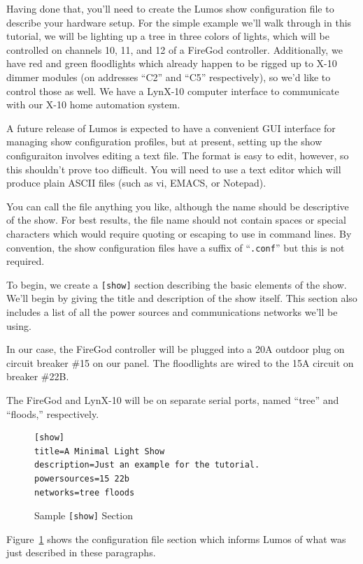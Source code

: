 \documentclass{article}
\begin{document}
Having done that, you'll need to create the Lumos show configuration file to
describe your hardware setup.  For the simple example we'll walk through in
this tutorial, we will be lighting up a tree in three colors of lights, which
will be controlled on channels 10, 11, and 12 of a FireGod controller.
Additionally, we have red and green floodlights which already happen to be
rigged up to X-10 dimmer modules (on addresses ``C2'' and ``C5'' respectively),
so we'd like to control those as well.
We have a LynX-10 computer interface to communicate with our X-10 home
automation system.

A future release of Lumos is expected to have a convenient GUI interface for
managing show configuration profiles, but at present, setting up the show
configuraiton involves editing a text file.  The format is easy to edit,
however, so this shouldn't prove too difficult.  You will need to use a text
editor which will produce plain ASCII files (such as vi, EMACS, or Notepad).

You can call the file anything you like, although the name should be
descriptive of the show.  For best results, the file name should not contain
spaces or special characters which would require quoting or escaping to use in
command lines.  By convention, the show configuration files have a suffix of
``{\tt.conf}'' but this is not required.

To begin, we create a {\tt[show]} section describing the basic elements of the
show.  We'll begin by giving the title and description of the show itself.
This section also includes a list of all the power sources and communications
networks we'll be using.

In our case, the FireGod controller will be plugged into a 20A outdoor plug on
circuit breaker \#15 on our panel.  The floodlights are wired to the 15A
circuit on breaker \#22B.

The FireGod and LynX-10 will be on separate serial ports, named ``tree'' and
``floods,'' respectively.

\begin{figure}[htbp]
\begin{verbatim}
[show]
title=A Minimal Light Show
description=Just an example for the tutorial.
powersources=15 22b
networks=tree floods
\end{verbatim}
\caption{Sample {\tt[show]} Section}
\label{conf:show}
\end{figure}

Figure~\ref{conf:show} shows the configuration file section which informs 
Lumos of what was just described in these paragraphs.
\end{document}
